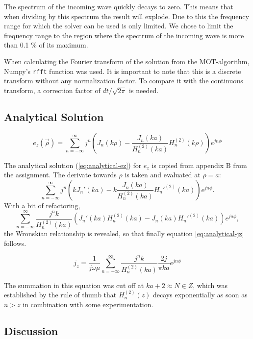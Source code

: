 \documentclass{article}
\begin{document}
The spectrum of the incoming wave quickly decays to zero. 
This means that when dividing by this spectrum the result will explode.
Due to this the frequency range for which the solver can be used is only limited.
We chose to limit the frequency range to the region where the spectrum of the incoming wave is more than 0.1 \% of its maximum.

When calculating the Fourier transform of the solution from the MOT-algorithm, 
Numpy's \texttt{rfft} function was used. 
It is important to note that this is a discrete transform without any normalization factor.
To compare it with the continuous transform, a correction factor of \(dt/\sqrt{2 \pi}\) is needed.

\subsection{Analytical Solution}

\begin{equation}\label{eq:analytical-ez}
    e_z(\vec{\rho}) = \sum_{n=-\infty}^{\infty} j^n \left( J_n(k\rho) - \frac{J_n(ka)}{H_n^{(2)}(ka)} H_n^{(2)}(k\rho) \right) e^{j n \phi}
\end{equation}

The analytical solution (\ref{eq:analytical-ez}) for \(e_z\) is copied from appendix B from the assignment.
The derivate towards \(\rho\) is taken and evaluated at \(\rho = a\):
\[ \sum_{n=-\infty}^{\infty} j^n \left( k J_n'(k a) - k \frac{J_n(ka)}{H_n^{(2)}(ka)} H_n'^{(2)}(k a) \right) e^{j n \phi}. \]
With a bit of refactoring, 
\[ \sum_{n=-\infty}^{\infty} \frac{j^n k}{H_n^{(2)}(ka)} \left( J_n'(k a) H_n^{(2)}(ka) - J_n(ka) H_n'^{(2)}(k a) \right) e^{j n \phi}, \]
the Wronskian relationship is revealed,
so that finally equation \ref{eq:analytical-jz} follows.

\begin{equation}\label{eq:analytical-jz}
    j_z = \frac{1}{j \omega \mu} \sum_{n=-\infty}^{\infty} \frac{j^n k}{H_n^{(2)}(ka)} \frac{2 j}{\pi k a} e^{j n \phi}
\end{equation}

The summation in this equation was cut off at \(k a + 2 \approx N \in Z\),
which was established by the rule of thumb that \(H_n^{(2)}(z)\) decays exponentially
as soon as \(n > z\) in combination with some experimentation.

\subsection{Discussion}
\end{document}
